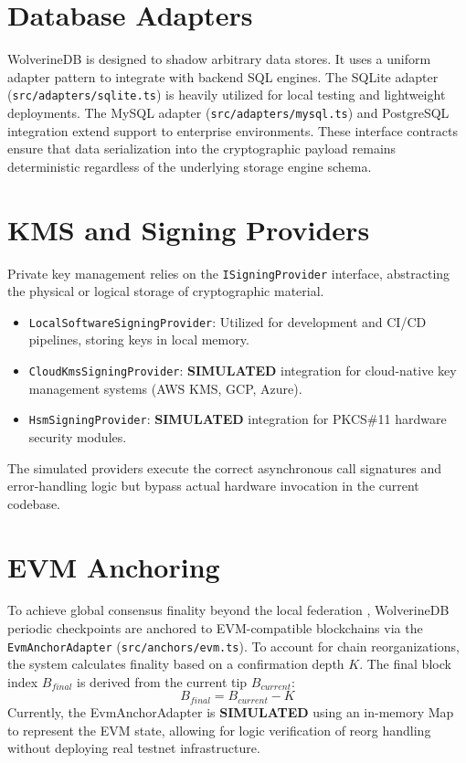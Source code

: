 \section{Database Adapters}\label{sec:wdb-adapters}
WolverineDB is designed to shadow arbitrary data stores. It uses a uniform adapter pattern to integrate with backend SQL engines. The SQLite adapter (\texttt{src/adapters/sqlite.ts}) is heavily utilized for local testing and lightweight deployments. The MySQL adapter (\texttt{src/adapters/mysql.ts}) and PostgreSQL integration extend support to enterprise environments. These interface contracts ensure that data serialization into the cryptographic payload remains deterministic regardless of the underlying storage engine schema.

\section{KMS and Signing Providers}\label{sec:wdb-kms}
Private key management relies on the \texttt{ISigningProvider} interface, abstracting the physical or logical storage of cryptographic material.
\begin{itemize}
    \item \texttt{LocalSoftwareSigningProvider}: Utilized for development and CI/CD pipelines, storing keys in local memory.
    \item \texttt{CloudKmsSigningProvider}: \textbf{SIMULATED} integration for cloud-native key management systems (AWS KMS, GCP, Azure).
    \item \texttt{HsmSigningProvider}: \textbf{SIMULATED} integration for PKCS\#11 hardware security modules.
\end{itemize}
The simulated providers execute the correct asynchronous call signatures and error-handling logic but bypass actual hardware invocation in the current codebase.

\section{EVM Anchoring}\label{sec:wdb-evm}
To achieve global consensus finality beyond the local federation \cite{nakamoto2008bitcoin}, WolverineDB periodic checkpoints are anchored to EVM-compatible blockchains via the \texttt{EvmAnchorAdapter} (\texttt{src/anchors/evm.ts}). To account for chain reorganizations, the system calculates finality based on a confirmation depth $K$. The final block index $B_{final}$ is derived from the current tip $B_{current}$:
\begin{equation}
B_{final} = B_{current} - K
\label{eq:wdb-finality}
\end{equation}
Currently, the EvmAnchorAdapter is \textbf{SIMULATED} using an in-memory Map to represent the EVM state, allowing for logic verification of reorg handling without deploying real testnet infrastructure.

